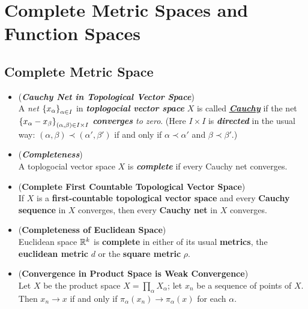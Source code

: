\documentclass[11pt]{article}
\begin{document}
\section{Complete Metric Spaces and Function Spaces}
\subsection{Complete Metric Space}
\begin{itemize}
\item \begin{definition} (\emph{\textbf{Cauchy Net in Topological Vector Space}})\\
A \emph{net}  $\left\{x_\alpha\right\}_{\alpha \in I}$ in \emph{\textbf{toplogocial vector space}} $X$ is called \underline{\emph{\textbf{Cauchy}}} if the net $\left\{x_{\alpha} - x_{\beta}\right\}_{(\alpha, \beta) \in I \times I}$
\emph{\textbf{converges} to zero}. (Here $I \times I$ is \emph{\textbf{directed}} in the usual way: $(\alpha, \beta) \prec (\alpha', \beta')$ if and only if $\alpha \prec \alpha'$ and $\beta \prec \beta'$.) 
\end{definition}

\item \begin{definition} (\emph{\textbf{Completeness}})\\
A toplogocial vector space $X$ is \emph{\textbf{complete}} if every Cauchy net converges.
\end{definition}

\item \begin{proposition} (\textbf{Complete First Countable Topological Vector Space})\\
If $X$ is a \textbf{first-countable topological vector space} and every \textbf{Cauchy sequence} in $X$ converges, then every \textbf{Cauchy net} in $X$ converges.
\end{proposition}

\item \begin{proposition} (\textbf{Completeness of Euclidean Space}) \citep{munkres2000topology} \\
Euclidean space ${\mathbb R}^k$ is \textbf{complete} in either of its usual \textbf{metrics}, the \textbf{euclidean metric} $d$ or the \textbf{square metric} $\rho$.
\end{proposition}

\item \begin{lemma} (\textbf{Convergence in Product Space is Weak Convergence}) \citep{munkres2000topology} \\
Let $X$ be the product space $X = \prod_{\alpha}X_{\alpha}$; let $x_n$ be a sequence of points of $X$. Then $x_n \rightarrow x$ if and only if $\pi_{\alpha}(x_n) \rightarrow  \pi_{\alpha}(x)$ for each $\alpha$.
\end{lemma}


\end{itemize}
\end{document}
